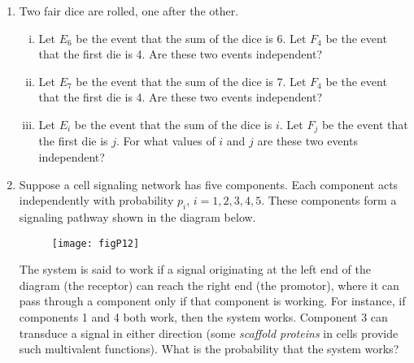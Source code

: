 \documentclass[12pt,letterpaper]{article}
\begin{document}
\begin{enumerate}

\item Two fair dice are rolled, one after the other.
\begin{enumerate}[i.]
\item Let $E_{6}$ be the event that the sum of the dice is 6. Let $F_4$ be the event that the first die is 4. Are these two events independent?
\item Let $E_{7}$ be the event that the sum of the dice is 7. Let $F_4$ be the event that the first die is 4. Are these two events independent?
\item Let $E_i$ be the event that the sum of the dice is $i$. Let $F_j$ be the event that the first die is $j$. For what values of $i$ and $j$ are these two events independent?
\end{enumerate}

\item Suppose a cell signaling network has five components. Each component acts independently with probability $p_i$, $i=1,2,3,4,5$. These components form a signaling pathway shown in the diagram below.
\begin{figure}[h!]
\centering\texttt{[image: figP12]}
\end{figure}
The system is said to work if a signal originating at the left end of the diagram (the receptor) can reach the right end (the promotor), where it can pass through a component only if that component is working. For instance, if components 1 and 4 both work, then the system works. Component 3 can transduce a signal in either direction (some \emph{scaffold proteins} in cells provide such multivalent functions). What is the probability that the system works?

\end{enumerate}
\end{document}
